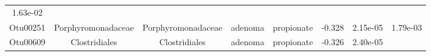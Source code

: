 \documentclass[11pt,]{article}
\begin{document}
\begin{longtable}[]{@{}cccccccc@{}}
\begin{minipage}[t]{0.08\columnwidth}
1.63e-02\strut
\end{minipage}\tabularnewline
\begin{minipage}[t]{0.08\columnwidth}\centering\strut
Otu00251\strut
\end{minipage} & \begin{minipage}[t]{0.15\columnwidth}\centering\strut
Porphyromonadaceae\strut
\end{minipage} & \begin{minipage}[t]{0.15\columnwidth}\centering\strut
Porphyromonadaceae\strut
\end{minipage} & \begin{minipage}[t]{0.08\columnwidth}\centering\strut
adenoma\strut
\end{minipage} & \begin{minipage}[t]{0.09\columnwidth}\centering\strut
propionate\strut
\end{minipage} & \begin{minipage}[t]{0.07\columnwidth}\centering\strut
-0.328\strut
\end{minipage} & \begin{minipage}[t]{0.08\columnwidth}\centering\strut
2.15e-05\strut
\end{minipage} & \begin{minipage}[t]{0.08\columnwidth}\centering\strut
1.79e-03\strut
\end{minipage}\tabularnewline
\begin{minipage}[t]{0.08\columnwidth}\centering\strut
Otu00609\strut
\end{minipage} & \begin{minipage}[t]{0.15\columnwidth}\centering\strut
Clostridiales\strut
\end{minipage} & \begin{minipage}[t]{0.15\columnwidth}\centering\strut
Clostridiales\strut
\end{minipage} & \begin{minipage}[t]{0.08\columnwidth}\centering\strut
adenoma\strut
\end{minipage} & \begin{minipage}[t]{0.09\columnwidth}\centering\strut
propionate\strut
\end{minipage} & \begin{minipage}[t]{0.07\columnwidth}\centering\strut
-0.326\strut
\end{minipage} & \begin{minipage}[t]{0.08\columnwidth}\centering\strut
2.40e-05\strut
\end{minipage} & \begin{minipage}[t]{0.08\columnwidth}\centering\strut

\end{minipage}
\end{longtable}
\end{document}
